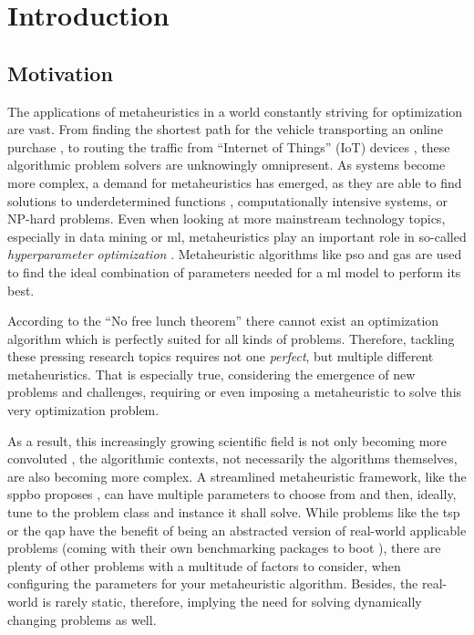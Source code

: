 
\chapter{Introduction}

\section{Motivation}

The applications of metaheuristics in a world constantly striving for optimization are vast. From finding the shortest path for the vehicle transporting an online purchase \cite{vogel2011flexible}, to routing the traffic from \enquote{Internet of Things} (IoT) devices \cite{sharma2022systematic}, these algorithmic problem solvers are unknowingly omnipresent. As systems become more complex, a demand for metaheuristics has emerged, as they are able to find solutions to underdetermined functions \cite{jamisola2009using}, computationally intensive systems, or NP-hard problems. Even when looking at more mainstream technology topics, especially in data mining or \gls{ml}, metaheuristics play an important role in so-called \textit{hyperparameter optimization} \cite{yang2020hyperparameter}. Metaheuristic algorithms like \gls{pso} and \glspl{ga} are used to find the ideal combination of parameters needed for a \gls{ml} model to perform its best.

According to the \enquote{No free lunch theorem} \cite{wolpert1997no} there cannot exist an optimization algorithm which is perfectly suited for all kinds of problems. Therefore, tackling these pressing research topics requires not one \textit{perfect}, but multiple different metaheuristics. That is especially true, considering the emergence of new problems and challenges, requiring or even imposing a metaheuristic to solve this very optimization problem.

 As a result, this increasingly growing scientific field is not only becoming more convoluted \cite{sorensen2018history}, the algorithmic contexts, not necessarily the algorithms themselves, are also becoming more complex. A streamlined metaheuristic framework, like the \gls{sppbo} proposes \cite{lin2015simple}, can have multiple parameters to choose from and then, ideally, tune to the problem class and instance it shall solve. While problems like the \gls{tsp} or the \gls{qap} have the benefit of being an abstracted version of real-world applicable problems (coming with their own benchmarking packages to boot \cite{reinelt1991tsplib, burkard1997qaplib}), there are plenty of other problems with a multitude of factors to consider, when configuring the parameters for your metaheuristic algorithm. Besides, the real-world is rarely static, therefore, implying the need for solving dynamically changing problems as well.


